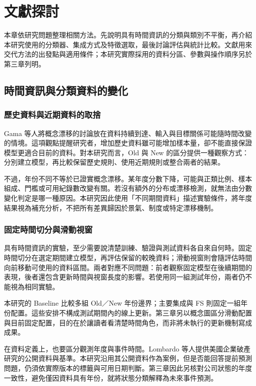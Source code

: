 \chapter{文獻探討}\label{chap:literature}
\begingroup
\setlength{\emergencystretch}{2em}

本章依研究問題整理相關方法。先說明具有時間資訊的分類與類別不平衡，再介紹本研究使用的分類器、集成方式及特徵選取，最後討論評估與統計比較。文獻用來交代方法的出發點與適用條件；本研究實際採用的資料分區、參數與操作順序另於第三章列明。

\section{時間資訊與分類資料的變化}

\subsection{歷史資料與近期資料的取捨}

Gama 等人\autocite{gama2014drift}將概念漂移的討論放在資料持續到達、輸入與目標關係可能隨時間改變的情境。這項觀點提醒研究者，增加歷史資料雖可能增加樣本量，卻不能直接保證模型更適合目前的資料。對本研究而言，Old 與 New 的區分提供一種觀察方式：分別建立模型，再比較保留歷史規則、使用近期規則或整合兩者的結果。

不過，年份不同不等於已證實概念漂移。某年度分數下降，可能與正類比例、樣本組成、門檻或可用紀錄數改變有關。若沒有額外的分布或漂移檢測，就無法由分數變化判定是哪一種原因。本研究因此使用「不同期間資料」描述實驗條件，將年度結果視為補充分析，不把所有差異歸因於景氣、制度或特定漂移機制。

\subsection{固定時間切分與滑動視窗}

具有時間資訊的實驗，至少需要說清楚訓練、驗證與測試資料各自來自何時。固定時間切分在選定期間建立模型，再評估保留的較晚資料；滑動視窗則會隨評估時間向前移動可使用的資料區間。兩者對應不同問題：前者觀察固定模型在後續期間的表現，後者還包含更新時間與視窗長度的影響。若使用同一組測試年份，兩者仍不能視為相同實驗。

本研究的 Baseline 比較多組 Old／New 年份邊界；主要集成與 FS 則固定一組年份配置。這些安排不構成測試期間內的線上更新。第三章另以概念圖區分滑動配置與目前固定配置，目的在於讓讀者看清楚時間角色，而非將未執行的更新機制寫成成果。

在資料定義上，也要區分觀測年度與事件時間。Lombardo 等人\autocite{lombardo2022bankruptcy}提供美國企業破產研究的公開資料與基準。本研究沿用其公開資料作為案例，但是否能回答提前預測問題，仍須依實際版本的標籤與可用日期判斷。第三章因此另核對公司狀態的年度一致性，避免僅因資料具有年份，就將狀態分類解釋為未來事件預測。

